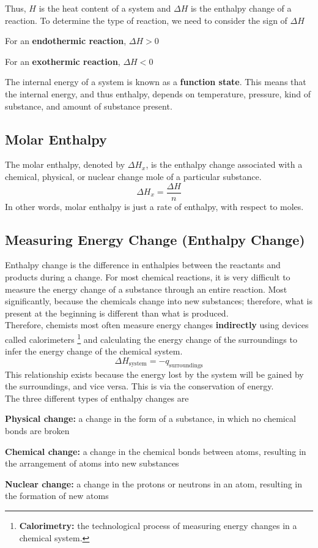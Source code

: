 Thus, $H$ is the heat content of a system and $\Delta H$ is the enthalpy change of a reaction.
To determine the type of reaction, we need to consider the sign of $\Delta H$
\begin{bulleted-list}
    \item For an \textbf{endothermic reaction}, $\Delta H>0$
    \item For an \textbf{exothermic reaction}, $\Delta H<0$
\end{bulleted-list}
The internal energy of a system is known as a \textbf{function state}. This means that the internal
energy, and thus enthalpy, depends on temperature, pressure, kind of substance, and amount of 
substance present.

\subsection{Molar Enthalpy}
The molar enthalpy, denoted by $\Delta H_x$, is the enthalpy change associated with a chemical,
physical, or nuclear change mole of a particular substance.
\[
    \Delta H_x=\frac{\Delta H}{n}
\]
In other words, molar enthalpy is just a rate of enthalpy, with respect to moles.

\subsection{Measuring Energy Change (Enthalpy Change)}
Enthalpy change is the difference in enthalpies between the reactants and products during a change.
For most chemical reactions, it is very difficult to measure the energy change of a substance
through an entire reaction. Most significantly, because the chemicals change into new substances;
therefore, what is present at the beginning is different than what is produced.\\

Therefore, chemists most often measure energy changes \textbf{indirectly} using devices called
calorimeters
\footnote{
    \textbf{Calorimetry:} the technological process of measuring energy changes in a chemical
    system.
}
and calculating the energy change of the surroundings to infer the energy change of
the chemical system.
\[
    \Delta H_\text{system}=-q_\text{surroundings}
\]
This relationship exists because the energy lost by the system will be gained by the surroundings,
and vice versa. This is via the conservation of energy.\\

The three different types of enthalpy changes are
\begin{enum}
    \item \textbf{Physical change:} a change in the form of a substance, in which no chemical
        bonds are broken
    \item \textbf{Chemical change:} a change in the chemical bonds between atoms, resulting in the
        arrangement of atoms into new substances
    \item \textbf{Nuclear change:} a change in the protons or neutrons in an atom, resulting in
        the formation of new atoms
\end{enum}


